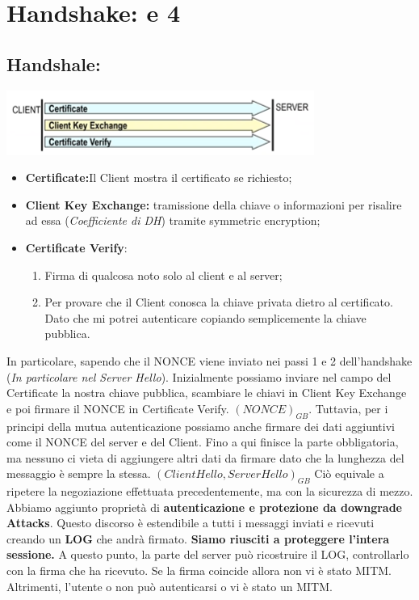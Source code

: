 \documentclass{book}
\theoremstyle{remark}
\begin{document}
\section{Handshake: e 4}
\subsection{Handshale:}
\begin{center}
	\includegraphics[scale=0.6]{2021-12-08-16-34-57.png}
\end{center}
\begin{itemize}
	\item \textbf{Certificate:}Il Client mostra il certificato se richiesto;\@
	\item \textbf{Client Key Exchange:} tramissione della chiave o informazioni per risalire ad essa (\emph{Coefficiente di DH}) tramite symmetric encryption;\@
	\item \textbf{Certificate Verify}:\begin{enumerate}
		      \item Firma di qualcosa noto solo al client e al server;\@
		      \item Per provare che il Client conosca la chiave privata dietro al certificato\@. Dato che mi potrei autenticare copiando semplicemente la chiave pubblica\@.
	      \end{enumerate}
\end{itemize}
In particolare, sapendo che il NONCE viene inviato nei passi 1 e 2 dell'handshake (\emph{In particolare nel Server Hello})\@. Inizialmente possiamo inviare nel campo del Certificate la nostra chiave pubblica, scambiare le chiavi in Client Key Exchange e poi firmare il NONCE in Certificate Verify\@. \((NONCE)_{GB}\)\@. Tuttavia, per i principi della mutua autenticazione possiamo anche firmare dei dati aggiuntivi come il NONCE del server e del Client\@. Fino a qui finisce la parte obbligatoria, ma nessuno ci vieta di aggiungere altri dati da firmare dato che la lunghezza del messaggio è sempre la stessa\@. \((ClientHello,ServerHello)_{GB}\) Ciò equivale a ripetere la negoziazione effettuata precedentemente, ma con la sicurezza di mezzo\@. Abbiamo aggiunto proprietà di \textbf{autenticazione e protezione da downgrade Attacks}\@. Questo discorso è estendibile a tutti i messaggi inviati e ricevuti creando un \textbf{LOG} che andrà firmato\@. \newline
\textbf{Siamo riusciti a proteggere l'intera sessione\@.}\newline
A questo punto, la parte del server può ricostruire il LOG, controllarlo con la firma che ha ricevuto\@. Se la firma coincide allora non vi è stato MITM\@. Altrimenti, l'utente o non può autenticarsi o vi è stato un MITM\@.
\end{document}
